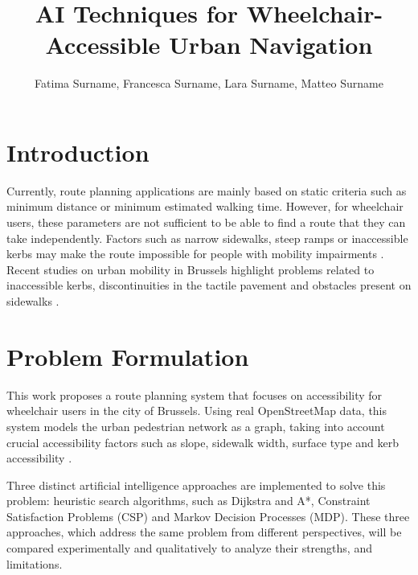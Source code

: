 \documentclass[letterpaper]{article} %
\title{AI Techniques for Wheelchair-Accessible Urban Navigation}
\author{
    Fatima Surname\equalcontrib,
    Francesca Surname\equalcontrib,
    Lara Surname\equalcontrib,
    Matteo Surname\equalcontrib
}
\begin{document}
\maketitle

\begin{abstract}
\end{abstract}

\begin{links}
\end{links}

\section{Introduction}

Currently, route planning applications are mainly based on static criteria such as minimum distance or minimum estimated walking time. However, for wheelchair users, these parameters are not sufficient to be able to find a route that they can take independently. Factors such as narrow sidewalks, steep ramps or inaccessible kerbs may make the route impossible for people with mobility impairments \cite{darko2022}. Recent studies on urban mobility in Brussels highlight problems related to inaccessible kerbs, discontinuities in the tactile pavement and obstacles present on sidewalks \cite{dobruszkes2025}.

\section{Problem Formulation}

This work proposes a route planning system that focuses on accessibility for wheelchair users in the city of Brussels. Using real OpenStreetMap data, this system models the urban pedestrian network as a graph, taking into account crucial accessibility factors such as slope, sidewalk width, surface type and kerb accessibility \cite{kaselouris2025}.

Three distinct artificial intelligence approaches are implemented to solve this problem: heuristic search algorithms, such as Dijkstra and A*, Constraint Satisfaction Problems (CSP) and Markov Decision Processes (MDP). These three approaches, which address the same problem from different perspectives, will be compared experimentally and qualitatively to analyze their strengths, and limitations.
\end{document}
